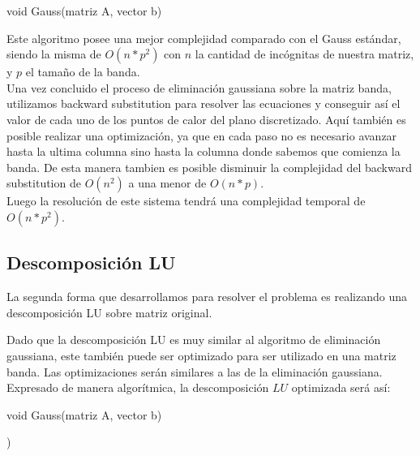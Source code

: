 \begin{algorithm}
\begin{algorithmic}[1]\parskip=1mm
\caption{void Gauss(matriz A, vector b)}
\end{algorithmic}
\end{algorithm}

Este algoritmo posee una mejor complejidad comparado con el Gauss estándar, siendo la misma de $O(n*p^2)$ con $n$ la cantidad de incógnitas de nuestra matriz, y $p$ el tamaño de la banda.
\\
Una vez concluido el proceso de eliminación gaussiana sobre la matriz banda, utilizamos backward substitution para resolver las ecuaciones y conseguir así el valor de cada uno de los puntos de calor del plano discretizado. Aquí también es posible realizar una optimización, ya que en cada paso no es necesario avanzar hasta la ultima columna sino hasta la columna donde sabemos que comienza la banda. De esta manera tambien es posible disminuir la complejidad del backward substitution de $O(n^2)$ a una menor de $O(n*p)$.
\\
Luego la resolución de este sistema tendrá una complejidad temporal de $O(n*p^2)$.

\subsection{Descomposición LU}

La segunda forma que desarrollamos para resolver el problema es realizando una descomposición LU sobre matriz original.

Dado que la descomposición LU es muy similar al algoritmo de eliminación gaussiana, este también puede ser optimizado para ser utilizado en una matriz banda. Las optimizaciones serán similares a las de la eliminación gaussiana. Expresado de manera algorítmica, la descomposición $LU$ optimizada será así:

\begin{algorithm}
\begin{algorithmic}[1]\parskip=1mm
\caption{void Gauss(matriz A, vector b)}
   )
\end{algorithmic}
\end{algorithm}

